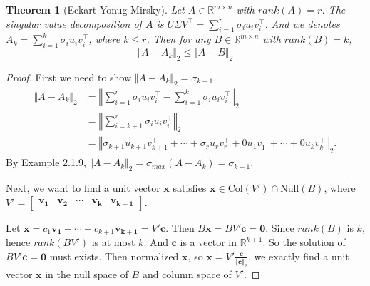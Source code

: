 \documentclass[12pt]{article}
\newtheorem{EYM}{Theorem}
\begin{document}
    \begin{EYM}[Eckart-Yonug-Mirsky]
        Let $A \in \mathbb{R}^{m\times n}$ with $rank(A)=r$. The singular value decomposition of $A$ is $U\Sigma V^\top=\sum\limits_{i=1}^r{\sigma_iu_iv_i^\top}$. 
        And we denotes $A_k=\sum\limits_{i=1}^k{\sigma_iu_iv_i^\top}$, where $k\leq r$. Then for any  $B \in \mathbb{R}^{m\times n}$ with $rank(B)=k$,
        \[\Vert A-A_k \Vert_2 \leq \Vert A-B\Vert_2\]
    \end{EYM}

    \begin{proof}
        First we need to show $\Vert A-A_k \Vert_2=\sigma_{k+1}$.
        \begin{align*}
            \Vert A-A_k \Vert_2 
            &=\left\Vert \sum_{i=1}^r{\sigma_iu_iv_i^\top}-\sum_{i=1}^k{\sigma_iu_iv_i^\top} \right\Vert_2\\
            &=\left\Vert \sum_{i=k+1}^r{\sigma_iu_iv_i^\top}\right\Vert_2\\
            &=\left\Vert \sigma_{k+1}u_{k+1}v_{k+1}^\top+\cdots+\sigma_ru_rv_r^\top+0u_1v_1^\top+\cdots+0u_kv_k^\top\right\Vert_2.
        \end{align*}
        By Example 2.1.9, $\Vert A-A_k \Vert_2=\sigma_{max}(A-A_k)=\sigma_{k+1}$.

        Next, we want to find a unit vector $\mathbf{x}$ satisfies $\mathbf{x} \in \text{Col}(V') \cap \text{Null}(B)$, where $V'=\begin{bmatrix}
            \mathbf{v_1}&\mathbf{v_2}&\cdots&\mathbf{v_k}&\mathbf{v_{k+1}}
        \end{bmatrix}$.
        
        Let $\mathbf{x}=c_1\mathbf{v_1}+\cdots+c_{k+1}\mathbf{v_{k+1}}=V'\mathbf{c}$. Then $B\mathbf{x}=BV'\mathbf{c}=\mathbf{0}$. Since $rank(B)$ is $k$, hence $rank(BV')$ is at most $k$. And $\mathbf{c}$ is a vector in $\mathbb{R}^{k+1}$. So the solution of $BV'\mathbf{c}=\mathbf{0}$ must exists. Then normalized $\mathbf{x}$, so $\mathbf{x}=V'\frac{\mathbf{c}}{\Vert\mathbf{c}\Vert_2}$, we exactly find a unit vector $\mathbf{x}$ in the null space of $B$ and column space of $V'$.


\end{proof}
\end{document}
